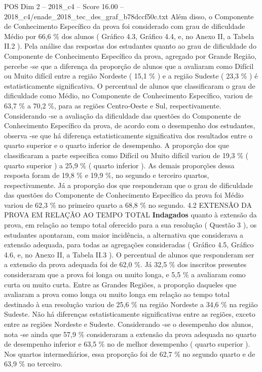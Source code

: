 \begin{textsample}{POS Dim 2 – 2018\_c4 – Score 16.00 – 2018\_c4/enade\_2018\_tec\_des\_graf\_b78dccf50c.txt}
Além disso, o Componente de Conhecimento Específico da prova foi considerado com grau de dificuldade Médio por 66,6 \% dos alunos ( Gráfico 4.3, Gráfico 4.4, e, no Anexo II, a Tabela II.2 ).
Pela análise das respostas dos estudantes quanto ao grau de dificuldade do Componente de Conhecimento Específico da prova, agregado por Grande Região, percebe -se que a diferença da proporção de alunos que a avaliaram como Difícil ou Muito difícil entre a região Nordeste ( 15,1 \% ) e a região Sudeste ( 23,3 \% ) é estatisticamente significativa.
O percentual de alunos que classificaram o grau de dificuldade como Médio, no Componente de Conhecimento Específico, variou de 63,7 \% a 70,2 \%, para as regiões Centro-Oeste e Sul, respectivamente.
Considerando -se a avaliação da dificuldade das questões do Componente de Conhecimento Específico da prova, de acordo com o desempenho dos estudantes, observa -se que há diferença estatisticamente significativa dos resultados entre o quarto superior e o quarto inferior de desempenho.
A proporção dos que classificaram a parte específica como Difícil ou Muito difícil variou de 19,3 \% ( quarto superior ) a 25,9 \% ( quarto inferior ).
As demais proporções dessa resposta foram de 19,8 \% e 19,9 \%, no segundo e terceiro quartos, respectivamente.
Já a proporção dos que responderam que o grau de dificuldade das questões do Componente de Conhecimento Específico da prova foi Médio variou de 62,3 \% no primeiro quarto a 68,8 \% no segundo. 4.2 EXTENSÃO DA PROVA EM RELAÇÃO AO TEMPO TOTAL \textbf{Indagados} quanto à extensão da prova, em relação ao tempo total oferecido para a sua resolução ( Questão 3 ), os estudantes apontaram, com maior incidência, a alternativa que considerava a extensão adequada, para todas as agregações consideradas ( Gráfico 4.5, Gráfico 4.6, e, no Anexo II, a Tabela II.3 ).
O percentual de alunos que responderam ser a extensão da prova adequada foi de 62,0 \%.
Já 32,5 \% dos inscritos presentes consideraram que a prova foi longa ou muito longa, e 5,5 \% a avaliaram como curta ou muito curta.
Entre as Grandes Regiões, a proporção daqueles que avaliaram a prova como longa ou muito longa em relação ao tempo total destinado à sua resolução variou de 25,6 \% na região Nordeste a 34,6 \% na região Sudeste.
Não há diferenças estatisticamente significativas entre as regiões, exceto entre as regiões Nordeste e Sudeste.
Considerando -se o desempenho dos alunos, nota -se ainda que 57,9 \% consideraram a extensão da prova adequada no quarto de desempenho inferior e 63,5 \% no de melhor desempenho ( quarto superior ).
Nos quartos intermediários, essa proporção foi de 62,7 \% no segundo quarto e de 63,9 \% no terceiro.

\end{textsample}
